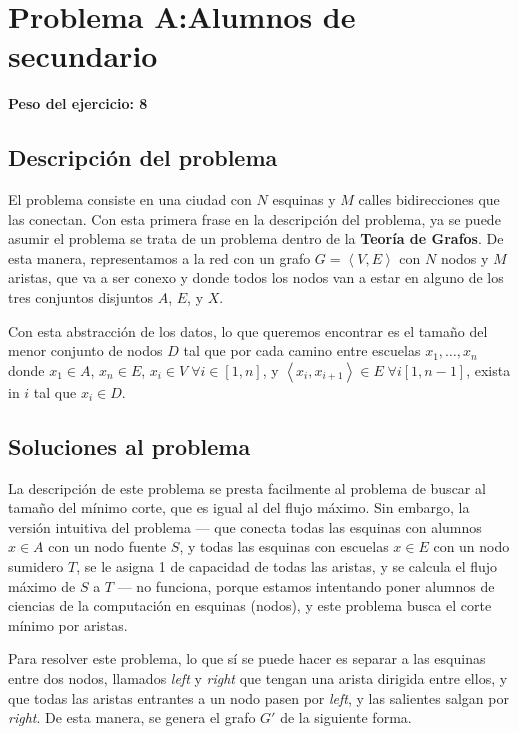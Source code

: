 \newcommand{\mleft}{\text{left}}
\newcommand{\mright}{\text{right}}
\newpage{}

\section{Problema A:\@ Alumnos de secundario}
\textbf{Peso del ejercicio: 8}

\subsection{Descripción del problema}

El problema consiste en una ciudad con \(N\) esquinas y \(M\) calles bidirecciones que las conectan. Con esta primera frase en la descripción del problema, ya se puede asumir el problema se trata de un problema dentro de la \textbf{Teoría de Grafos}. De esta manera, representamos a la red con un grafo \(G = \left<V, E\right>\) con \(N\) nodos y \(M\) aristas, que va a ser conexo y donde todos los nodos van a estar en alguno de los tres conjuntos disjuntos \(A\), \(E\), y \(X\).

Con esta abstracción de los datos, lo que queremos encontrar es el tamaño del menor conjunto de nodos \(D\) tal que por cada camino entre escuelas \(x_1, \ldots, x_n\) donde \(x_1 \in A\), \(x_n \in E\), \(x_i \in V \; \forall i \in \left[1, n\right]\), y \(\left<x_i, x_{i + 1}\right> \in E \; \forall i \left[1, n - 1\right]\), exista in \(i\) tal que \(x_i \in D\).

\subsection{Soluciones al problema}

La descripción de este problema se presta facilmente al problema de buscar al tamaño del mínimo corte, que es igual al del flujo máximo\cite[\textit{theorem~26.6}]{cormen}. Sin embargo, la versión intuitiva del problema --- que conecta todas las esquinas con alumnos \(x \in A\) con un nodo fuente \(S\), y todas las esquinas con escuelas \(x \in E\) con un nodo sumidero \(T\), se le asigna 1 de capacidad de todas las aristas, y se calcula el flujo máximo de \(S\) a \(T\) --- no funciona, porque estamos intentando poner alumnos de ciencias de la computación en esquinas (nodos), y este problema busca el corte mínimo por aristas.

Para resolver este problema, lo que sí se puede hacer es separar a las esquinas entre dos nodos, llamados \textit{left} y \textit{right} que tengan una arista dirigida entre ellos, y que todas las aristas entrantes a un nodo pasen por \textit{left}, y las salientes salgan por \textit{right}. De esta manera, se genera el grafo \(G'\) de la siguiente forma.

